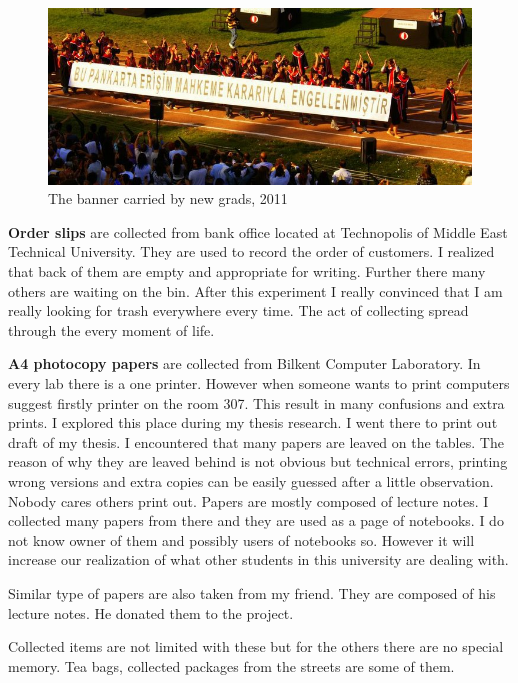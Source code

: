 \begin{figure}[h!]
  \centering
  \includegraphics[width=1\textwidth]{project_graphics/banner1.jpg}
  \caption{The banner carried by new grads, 2011}
  \label{fig:Banner_1}
\end{figure}

\textbf{Order slips} are collected from bank office located at Technopolis of Middle East Technical University. They are used to record the order of customers. I realized that back of them are empty and appropriate for writing. Further there many others are waiting on the bin. After this experiment I really convinced that I am really looking for trash everywhere every time. The act of collecting spread through the every moment of life. 

\textbf{A4 photocopy papers} are collected from Bilkent Computer Laboratory. In every lab there is a one printer. However when someone wants to print computers suggest firstly printer on the room 307. This result in many confusions and extra prints. I explored this place during my thesis research. I went there to print out draft of my thesis. I encountered that many papers are leaved on the tables.  The reason of why they are leaved behind is not obvious but technical errors, printing wrong versions and extra copies can be easily guessed after a little observation. Nobody cares others print out. Papers are mostly composed of lecture notes. I collected many papers from there and they are used as a page of notebooks. I do not know owner of them and possibly users of notebooks so. However it will increase our realization of what other students in this university are dealing with.

Similar type of papers are also taken from my friend. They are composed of his lecture notes. He donated them to the project.

Collected items are not limited with these but for the others there are no special memory. Tea bags, collected packages from the streets are some of them.

